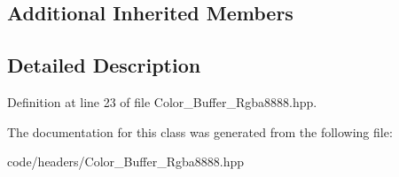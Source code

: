 \subsection*{Additional Inherited Members}


\subsection{Detailed Description}


Definition at line 23 of file Color\+\_\+\+Buffer\+\_\+\+Rgba8888.\+hpp.



The documentation for this class was generated from the following file\+:\begin{DoxyCompactItemize}
\item 
code/headers/Color\+\_\+\+Buffer\+\_\+\+Rgba8888.\+hpp\end{DoxyCompactItemize}
